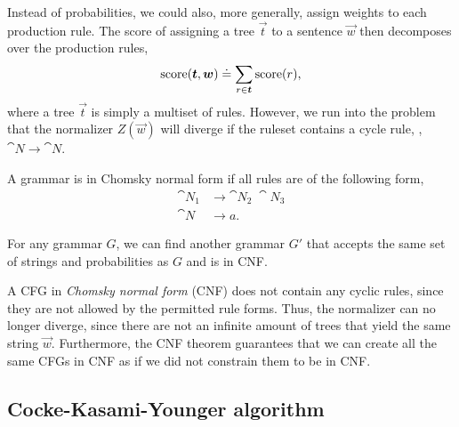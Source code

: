 Instead of probabilities, we could also, more generally, assign weights to each
production rule. The score of assigning a tree $\vec{t}$ to a sentence
$\vec{w}$ then decomposes over the production rules, \[
    \mathrm{score}(\bm{t},\bm{w}) \doteq \sum_{r\in\bm{t}} \mathrm{score}(r)
    ,\]
where a tree $\vec{t}$ is simply a multiset of rules. However, we run into the
problem that the normalizer $Z(\vec{w})$ will diverge if the ruleset contains a
cycle rule, \eg, $\cat{N}\to\cat{N}$.

\begin{definition}
    A grammar is in Chomsky normal form if all rules are of the following form,
    \begin{align*}
        \cat{N}_1 & \to \cat{N}_2 \; \cat{N}_3 \\
        \cat{N}   & \to a
        .\end{align*}
\end{definition}

\begin{theorem}
    For any grammar $G$, we can find another grammar $G'$ that accepts the same
    set of strings and probabilities as $G$ and is in CNF.
\end{theorem}

A CFG in \textit{Chomsky normal form} (CNF) does not contain any cyclic rules,
since they are not allowed by the permitted rule forms. Thus, the normalizer
can no longer diverge, since there are not an infinite amount of trees that
yield the same string $\vec{w}$. Furthermore, the CNF theorem guarantees that
we can create all the same CFGs in CNF as if we did not constrain them to be in
CNF.

\subsection{Cocke-Kasami-Younger algorithm}

